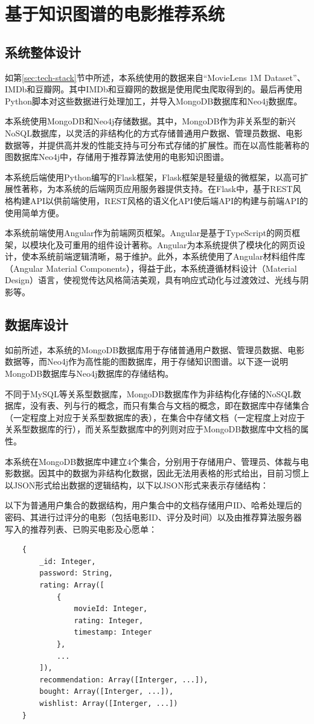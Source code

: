 \documentclass{bjfuthesis}
\begin{document}
\chapter{基于知识图谱的电影推荐系统}
\section{系统整体设计}
如第\ref{sec:tech-stack}节中所述，本系统使用的数据来自“MovieLens 1M Dataset”、IMDb和豆瓣网。其中IMDb和豆瓣网的数据是使用爬虫爬取得到的。最后再使用Python脚本对这些数据进行处理加工，并导入MongoDB数据库和Neo4j数据库。

本系统使用MongoDB和Neo4j存储数据。其中，MongoDB作为非关系型的新兴NoSQL数据库，以灵活的非结构化的方式存储普通用户数据、管理员数据、电影数据等，并提供高并发的性能支持与可分布式存储的扩展性。而在以高性能著称的图数据库Neo4j中，存储用于推荐算法使用的电影知识图谱。

本系统后端使用Python编写的Flask框架，Flask框架是轻量级的微框架，以高可扩展性著称，为本系统的后端网页应用服务器提供支持。在Flask中，基于REST风格构建API以供前端使用，REST风格的语义化API使后端API的构建与前端API的使用简单方便。

本系统前端使用Angular作为前端网页框架。Angular是基于TypeScript的网页框架，以模块化及可重用的组件设计著称。Angular为本系统提供了模块化的网页设计，使本系统前端逻辑清晰，易于维护。此外，本系统使用了Angular材料组件库（Angular Material Components），得益于此，本系统遵循材料设计（Material Design）语言，使视觉传达风格简洁美观，具有响应式动化与过渡效过、光线与阴影等。
\section{数据库设计}
如前所述，本系统的MongoDB数据库用于存储普通用户数据、管理员数据、电影数据等，而Neo4j作为高性能的图数据库，用于存储知识图谱。以下逐一说明MongoDB数据库与Neo4j数据库的存储结构。

不同于MySQL等关系型数据库，MongoDB数据库作为非结构化存储的NoSQL数据库，没有表、列与行的概念，而只有集合与文档的概念，即在数据库中存储集合（一定程度上对应于关系型数据库的表），在集合中存储文档（一定程度上对应于关系型数据库的行），而关系型数据库中的列则对应于MongoDB数据库中文档的属性。

本系统在MongoDB数据库中建立4个集合，分别用于存储用户、管理员、体裁与电影数据。因其中的数据为非结构化数据，因此无法用表格的形式给出，目前习惯上以JSON形式给出数据的逻辑结构，以下以JSON形式来表示存储结构：

以下为普通用户集合的数据结构，用户集合中的文档存储用户ID、哈希处理后的密码、其进行过评分的电影（包括电影ID、评分及时间）以及由推荐算法服务器写入的推荐列表、已购买电影及心愿单：
\begin{verbatim}
    {
        _id: Integer,
        password: String,
        rating: Array([
            {
                movieId: Integer,
                rating: Integer,
                timestamp: Integer
            },
            ...
        ]),
        recommendation: Array([Interger, ...]),
        bought: Array([Interger, ...]),
        wishlist: Array([Interger, ...])
    }
\end{verbatim}
\end{document}
